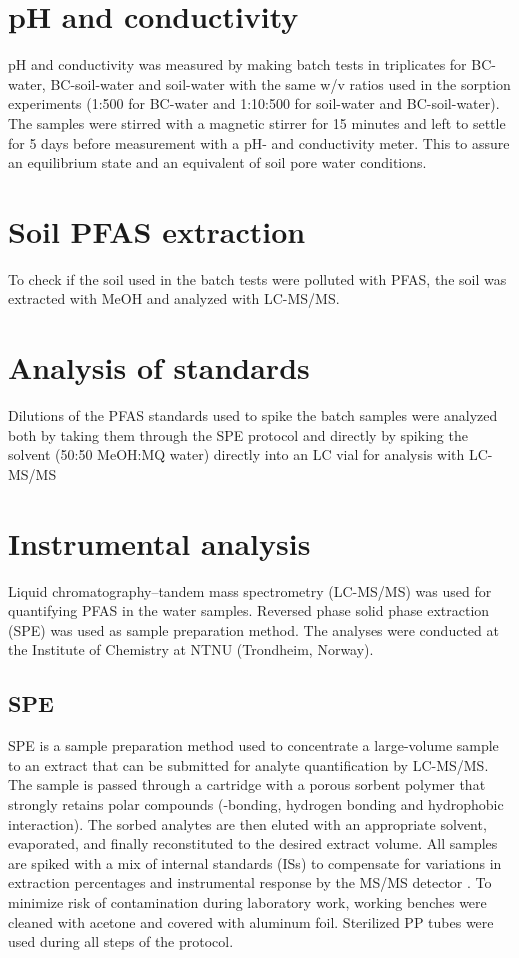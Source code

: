 \section{pH and conductivity}
pH and conductivity was measured by making batch tests in triplicates for BC-water, BC-soil-water and soil-water with the same w/v ratios used in the sorption experiments (1:500 for BC-water and 1:10:500 for soil-water and BC-soil-water). The samples were stirred with a magnetic stirrer for 15 minutes and left to settle for 5 days before measurement with a pH- and conductivity meter. This to assure an equilibrium state and an equivalent of soil pore water conditions.

\section{Soil PFAS extraction}
To check if the soil used in the batch tests were polluted with PFAS, the soil was extracted with MeOH and analyzed with LC-MS/MS. 

\section{Analysis of standards}
Dilutions of the PFAS standards used to spike the batch samples were analyzed both by taking them through the SPE protocol and directly by spiking the solvent (50:50 MeOH:MQ water) directly into an LC vial for analysis with LC-MS/MS 


\section{Instrumental analysis}
Liquid chromatography--tandem mass spectrometry (LC-MS/MS) was used for quantifying PFAS in the water samples. Reversed phase solid phase extraction (SPE) was used as sample preparation method. The analyses were conducted at the Institute of Chemistry at NTNU (Trondheim, Norway).

\subsection{SPE}
SPE is a sample preparation method used to concentrate a large-volume sample to an extract that can be submitted for analyte quantification by LC-MS/MS. The sample is passed through a cartridge with a porous sorbent polymer that strongly retains polar compounds (\textpi-\textpi bonding, hydrogen bonding and hydrophobic interaction). The sorbed analytes are then eluted with an appropriate solvent, evaporated, and finally reconstituted to the desired extract volume. All samples are spiked with a mix of internal standards (ISs) to compensate for variations in extraction percentages and instrumental response by the MS/MS detector \citep{arvaniti2014}. To minimize risk of contamination during laboratory work, working benches were cleaned with acetone and covered with aluminum foil. Sterilized PP tubes were used during all steps of the protocol.

